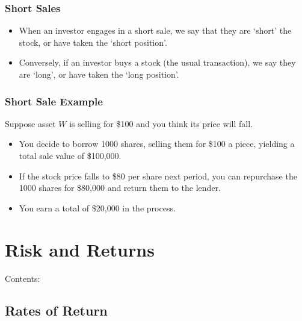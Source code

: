\documentclass[letterpaper,10pt,english]{sphinxmanual}
\begin{document}
\subsection{Short Sales}
\label{trading:id13}\begin{itemize}
\item {} 
When an investor engages in a short sale, we say that they are
`short' the stock, or have taken the `short position'.

\end{itemize}
\begin{itemize}
\item {} 
Conversely, if an investor buys a stock (the usual transaction), we
say they are `long', or have taken the `long position'.

\end{itemize}


\subsection{Short Sale Example}
\label{trading:short-sale-example}
Suppose asset $W$ is selling for \$100 and you think its price
will fall.
\begin{itemize}
\item {} 
You decide to borrow 1000 shares, selling them for \$100 a piece,
yielding a total sale value of \$100,000.

\end{itemize}
\begin{itemize}
\item {} 
If the stock price falls to \$80 per share next period, you can
repurchase the 1000 shares for \$80,000 and return them to the
lender.

\end{itemize}
\begin{itemize}
\item {} 
You earn a total of \$20,000 in the process.

\end{itemize}


\chapter{Risk and Returns}
\label{riskReturns::doc}\label{riskReturns:risk-and-returns}
Contents:


\section{Rates of Return}
\label{returns:rates-of-return}\label{returns::doc}
\end{document}
